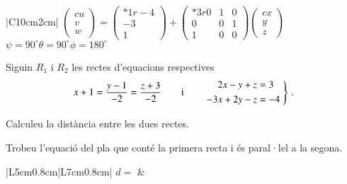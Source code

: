 \documentclass[10pt,catalan]{article}
\begin{document}
\begin{solucio}
\begin{center}
\begin{tabular}{|C{10cm}{2cm}|}
\hline
$\begin{pmatrix}{c} u \\ v \\ w\end{pmatrix} = 
\begin{pmatrix}{*{1}r} -4\\ -3\\ 1\end{pmatrix} + 
\begin{pmatrix}{*{3}r} 0 & 1 & 0\\ 0 & 0 & 1\\ 1 & 0 & 0\end{pmatrix}
\begin{pmatrix}{c} x \\ y \\ z\end{pmatrix}$ \\
\hline
{}
{$\psi=90^\circ$\hspace{1.7cm}$\theta=90^\circ$\hspace{1.7cm}$\phi=180^\circ$} \\
\hline
\end{tabular}
\end{center}
\end{solucio}





\begin{enunciat}
Siguin $R_1$ i $R_2$ les rectes d'equacions respectives
\[
  x + 1 = \frac{y - 1}{-2} = \frac{z + 3}{-2}\qquad\text{i}\qquad \left.\aligned 2 x - y + z &= 3 \\ - 3 x + 2 y - z &= -4 \endaligned\;\right\}\,.
\]
\begin{apartats}
\item Calculeu la distància entre les dues rectes.
\item Trobeu l'equació del pla que conté la primera recta i és paral·lel a la segona. 
\end{apartats}
\end{enunciat}

\begin{quadricula}
\begin{tabular}{|L{5cm}{0.8cm}|L{7cm}{0.8cm}|}
\hline
$d=$ & \\ 
\hline
\end{tabular}
\end{quadricula}
\end{document}
